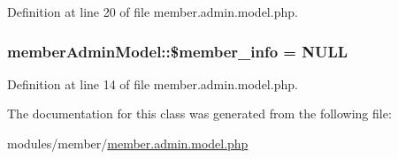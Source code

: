 Definition at line 20 of file member.\-admin.\-model.\-php.

\hypertarget{classmemberAdminModel_a4d4a6cc79e642c4dfabcf5f6666991b2}{
\subsubsection[{\$member\-\_\-info}]{\setlength{\rightskip}{0pt plus 5cm}member\-Admin\-Model\-::\$member\-\_\-info = N\-U\-L\-L}}\label{classmemberAdminModel_a4d4a6cc79e642c4dfabcf5f6666991b2}


Definition at line 14 of file member.\-admin.\-model.\-php.



The documentation for this class was generated from the following file\-:\begin{DoxyCompactItemize}
\item 
modules/member/\hyperlink{member_8admin_8model_8php}{member.\-admin.\-model.\-php}\end{DoxyCompactItemize}
